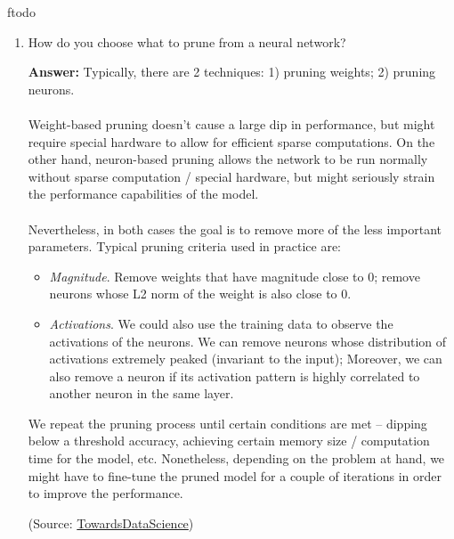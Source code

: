 ƒtodo\documentclass{article}
\newenvironment{QandA}{\begin{enumerate}[label=\arabic*.]}{\end{enumerate}}
\newenvironment{InnerQandA}{\begin{enumerate}[label=\roman*.]}{\end{enumerate}}
\newenvironment{answer}{\par\normalfont \textbf{Answer:}}{}
\begin{document}
\begin{QandA}
\begin{InnerQandA}
        \item How do you choose what to prune from a neural network?
        \begin{answer}
            Typically, there are 2 techniques: 1) pruning weights; 2) pruning neurons. \\\\
            Weight-based pruning doesn't cause a large dip in performance, but might require special hardware to allow for efficient sparse computations.  On the other hand, neuron-based pruning allows the network to be run normally without sparse computation / special hardware, but might seriously strain the performance capabilities of the model. \\\\
            Nevertheless, in both cases the goal is to remove more of the less important parameters. Typical pruning criteria used in practice are:
            \begin{itemize}
                \item \textit{Magnitude}. Remove weights that have magnitude close to 0; remove neurons whose L2 norm of the weight is also close to 0.
                \item \textit{Activations}. We could also use the training data to observe the activations of the neurons. We can remove neurons whose distribution of  activations extremely peaked (invariant to the input); Moreover, we can also remove a neuron if its activation pattern is highly correlated to another neuron in the same layer. 
            \end{itemize}

            We repeat the pruning process until certain conditions are met -- dipping below a threshold accuracy, achieving certain memory size / computation time for the model, etc. Nonetheless, depending on the problem at hand, we might have to fine-tune the pruned model for a couple of iterations in order to improve the performance. 
            
            (Source: \href{https://towardsdatascience.com/pruning-neural-networks-1bb3ab5791f9}{TowardsDataScience})
        \end{answer}
    \end{InnerQandA}


\end{QandA}
\end{document}
